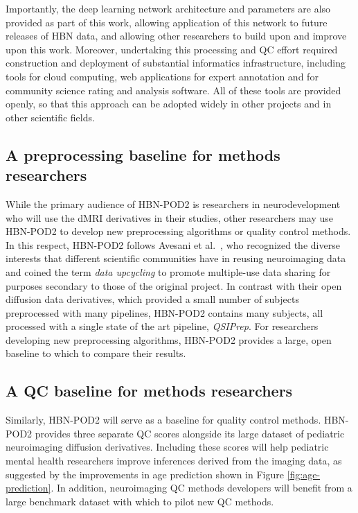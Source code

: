 \documentclass[fleqn,10pt]{wlscirep}
\begin{document}
Importantly, the deep learning network architecture and parameters are also
provided as part of this work, allowing application of this network to future
releases of HBN data, and allowing other researchers to build upon and improve
upon this work. Moreover, undertaking this processing and QC effort required
construction and deployment of substantial informatics infrastructure, including
tools for cloud computing, web applications for expert annotation and for
community science rating and analysis software. All of these tools are provided
openly, so that this approach can be adopted widely in other projects and in
other scientific fields.

\subsection*{A preprocessing baseline for methods researchers}

While the primary audience of HBN-POD2 is researchers in neurodevelopment who
will use the dMRI derivatives in their studies, other researchers may use
HBN-POD2 to develop new preprocessing algorithms or quality control methods. In
this respect, HBN-POD2 follows Avesani et al.~\cite{avesani2019-ey}, who
recognized the diverse interests that different scientific communities have in
reusing neuroimaging data and coined the term \emph{data upcycling} to promote
multiple-use data sharing for purposes secondary to those of the original
project. In contrast with their open diffusion data derivatives, which provided
a small number of subjects preprocessed with many pipelines, HBN-POD2 contains
many subjects, all processed with a single state of the art pipeline,
\emph{QSIPrep}. For researchers developing new preprocessing algorithms,
HBN-POD2 provides a large, open baseline to which to compare their results.

\subsection*{A QC baseline for methods researchers}

Similarly, HBN-POD2 will serve as a baseline for quality control methods.
HBN-POD2 provides three separate QC scores alongside its large dataset of
pediatric neuroimaging diffusion derivatives. Including these scores will help
pediatric mental health researchers improve inferences derived from the imaging
data, as suggested by the improvements in age prediction shown in Figure
\ref{fig:age-prediction}. In addition, neuroimaging QC methods developers will
benefit from a large benchmark dataset with which to pilot new QC methods.
\end{document}
